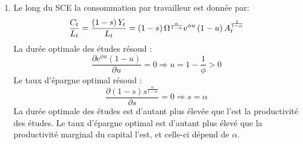 \documentclass[a4paper,11pt]{article}
\begin{document}
\begin{enumerate}
\item Le long du SCE la consommation par travailleur est donn\'{e}e par:%
\begin{equation*}
\frac{C_{t}}{L_{t}}=\frac{\left( 1-s\right) Y_{t}}{L_{t}}=\left( 1-s\right)
\Omega ^{\frac{\alpha }{1-\alpha }}\text{e}^{\phi u}\left( 1-u\right) A_{t}^{%
\frac{1}{1-\alpha }}
\end{equation*}%
La dur\'{e}e optimale des \'{e}tudes r\'{e}soud :%
\begin{equation*}
\frac{\partial \text{e}^{\phi u}\left( 1-u\right) }{\partial u}=0\Rightarrow
u=1-\frac{1}{\phi }>0
\end{equation*}%
Le taux d'\'{e}pargne optimal r\'{e}soud :%
\begin{equation*}
\frac{\partial \left( 1-s\right) s^{\frac{\alpha }{1-\alpha }}}{\partial s}%
=0\Rightarrow s=\alpha
\end{equation*}%
La dur\'{e}e optimale des \'{e}tudes est d'autant plus \'{e}lev\'{e}e que
l'est la productivit\'{e} des \'{e}tudes. Le taux d'\'{e}pargne optimal est
d'autant plus \'{e}lev\'{e} que la productivit\'{e} marginal du capital
l'est, et celle-ci d\'{e}pend de $\alpha $.
\end{enumerate}
\end{document}
